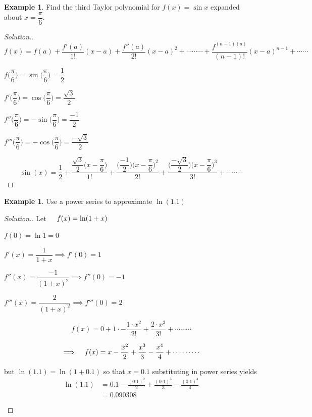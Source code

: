 \documentclass[11pt,a4paper]{article}
\theoremstyle{definition}
\newtheorem{exa}[thm]{Example}
\newenvironment{solution}
  {\renewcommand{\qedsymbol}{}\begin{proof}[\textit{Solution}.]}
  {\end{proof}}
\begin{document}
\begin{exa}


Find the third Taylor polynomial for $f(x) = \sin x$ expanded about $x = \dfrac{\pi}{6}$.
\end{exa}


\begin{solution}
$$f(x) = f(a) + \frac{f'(a)}{1!}(x-a) + \frac{f''(a)}{2!}(x-a)^2 + \cdots\cdots\cdots + \frac{f^{(n-1)(a)}}{(n-1)!}(x-a)^{n-1} + \cdots\cdots$$

$f\Big(\dfrac{\pi}{6}\Big) = \sin \Big(\dfrac{\pi}{6}\Big) = \dfrac{1}{2}$


$f'\Big(\dfrac{\pi}{6}\Big) = \cos \Big(\dfrac{\pi}{6}\Big) = \dfrac{\sqrt{3}}{2}$


$f''\Big(\dfrac{\pi}{6}\Big) = -\sin \Big(\dfrac{\pi}{6}\Big) = \dfrac{-1}{2}$


$f'''\Big(\dfrac{\pi}{6}\Big) = -\cos \Big(\dfrac{\pi}{6}\Big) = \dfrac{-\sqrt{3}}{2}$


$$\sin (x) = \dfrac{1}{2}  +\dfrac{\dfrac{\sqrt{3}}{2}\Big(x - \dfrac{\pi}{6}\Big)}{1!} + \dfrac{\Big(\dfrac{-1}{2}\Big)\Big(x - \dfrac{\pi}{6}\Big)^2}{2!} + \frac{\Big(\dfrac{-\sqrt{3}}{2}\Big)\Big(x - \dfrac{\pi}{6}\Big)^3}{3!} + \cdots\cdots\cdots$$
\end{solution}


\begin{exa}


Use a power series to approximate $\ln(1.1)$
\end{exa}


\begin{solution}


Let $\hspace{0.4cm} f(x) = \ln (1 + x)$


$f(0) = \ln 1 = 0$


$f'(x) = \dfrac{1}{1 + x} \implies f'(0) = 1$


$f''(x) = \dfrac{-1}{(1 + x)^2} \implies f''(0) = -1$


$f'''(x) = \dfrac{2}{(1 + x)^2}\implies f'''(0) = 2$


$$f(x) = 0 + 1\cdot - \dfrac{1\cdot x^2}{2!} + \dfrac{2\cdot x^3}{3!} + \cdots\cdots\cdots$$

$$\implies \hspace{0.3cm} f(x) = x - \dfrac{x^2}{2} + \frac{x^3}{3} - \frac{x^4}{4}+ \cdots\cdots\cdots$$

but $\ln (1.1) = \ln  ( 1 + 0.1)$ so that $x = 0.1$ substituting in power series yields 
\begin{align*}
\ln (1.1) &  = 0.1 - \frac{(0.1)^2}{2} + \frac{(0.1)^3}{3} - \frac{(0.1)^4}{4}\\
&  = 0.090308\\\\
\end{align*}
\end{solution}
\end{document}

